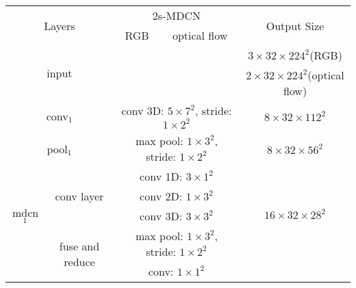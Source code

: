 \begin{table*}[]
\centering
\begin{tabular}{|cc|cc|cc|}
\hline
\multicolumn{2}{|c|}{\multirow{2}{*}{Layers}}                                                   & \multicolumn{2}{c|}{2s-MDCN}               & \multicolumn{2}{c|}{\multirow{2}{*}{Output Size}} \\ \cline{3-4}
\multicolumn{2}{|c|}{}                                                                          & \multicolumn{1}{c|}{RGB} & optical flow & \multicolumn{2}{c|}{}                             \\ \hline
\multicolumn{2}{|c|}{\multirow{2}{*}{input}}                                                    & \multicolumn{2}{c|}{\multirow{2}{*}{}}  & \multicolumn{2}{c|}{$3\times32\times{224}^2$(RGB)}       \\ 
\multicolumn{2}{|c|}{}  & \multicolumn{2}{c|}{} & \multicolumn{2}{c|}{$2\times32\times{224}^2$(optical flow)}               \\ \hline
\multicolumn{2}{|c|}{conv$_1$}  & \multicolumn{2}{c|}{conv 3D: ${5}\times{{7}^2} $, stride:  ${1}\times{{2}^2} $}               & \multicolumn{2}{c|}{$8\times{32}\times{112}^2$} \\ \hline

\multicolumn{2}{|c|}{pool$_1$}  & \multicolumn{2}{c|}{max pool: ${1}\times{{3}^2}$, stride:  ${1}\times{{2}^2} $}               & \multicolumn{2}{c|}{$8\times{32}\times{56}^2$} \\ \hline

\multicolumn{1}{|c|}{\multirow{4}{*}{mdcn$_1$}} & \multicolumn{1}{c|}{\multirow{3}{*}{conv layer}} & \multicolumn{2}{c|}{conv 1D: ${3}\times{{1}^2}$}   & \multicolumn{2}{c|}{\multirow{4}{*}{$16\times{32}\times{28}^2$}}      \\
\multicolumn{1}{|c|}{}                       & \multicolumn{1}{c|}{}                            & \multicolumn{2}{c|}{conv 2D: ${1}\times{{3}^2} $}           & \multicolumn{2}{c|}{}                             \\
\multicolumn{1}{|c|}{}                       & \multicolumn{1}{c|}{}                            & \multicolumn{2}{c|}{conv 3D: ${3}\times{{3}^2} $}           & \multicolumn{2}{c|}{}                             \\ \cline{2-4}

\multicolumn{1}{|c|}{}                                     & \multirow{2}{*}{fuse and reduce} & \multicolumn{2}{c|}{max pool: ${1}\times{{3}^2} $, stride:  ${1}\times{{2}^2} $ }            & \multicolumn{2}{c|}{}     \\
\multicolumn{1}{|c|}{}   &       & \multicolumn{2}{c|}{conv: ${1}\times{{1}^2} $ }  & \multicolumn{2}{c|}{} \\ \hline



\end{tabular}
\end{table*}
